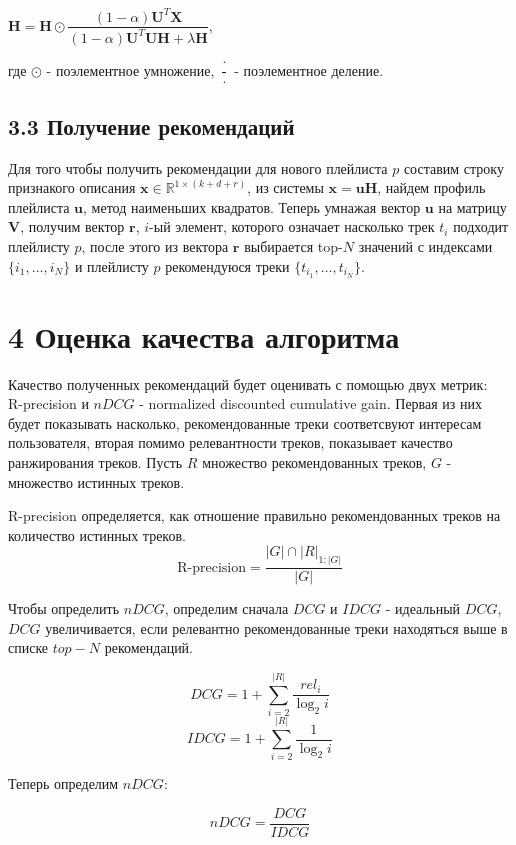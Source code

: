 \documentclass[12pt,twoside]{article}
\begin{document}
$\mathbf{H} = \mathbf{H} \odot \dfrac{(1 - \alpha)\mathbf{U}^T\mathbf{X}}{(1 - \alpha)\mathbf{U}^T\mathbf{UH} + \lambda\mathbf{H}}$,

где $\odot$ - поэлементное умножение, $\dfrac{\cdot}{\cdot}$ - поэлементное деление. 

\subsection{3.3 Получение рекомендаций}

Для того чтобы получить рекомендации для нового плейлиста $p$ составим строку признакого описания $\mathbf{x} \in \mathbb{R}^{1 \times  (k + d + r)}$, из системы $\mathbf{x} = \mathbf{u}\mathbf{H}$, найдем профиль плейлиста $\mathbf{u}$, метод наименьших квадратов. Теперь умнажая вектор $\mathbf{u}$ на матрицу $\mathbf{V}$, получим вектор $\mathbf{r}$, $i$-ый элемент, которого означает насколько трек $t_i$ подходит плейлисту  $p$, после этого из вектора $\mathbf{r}$ выбирается top-$N$ значений с индексами $\{i_1, \ldots, i_N\}$ и плейлисту $p$ рекомендуюся треки $\{t_{i_1}, \ldots, t_{i_N}\}$.

\section{4 Оценка качества алгоритма}

Качество полученных рекомендаций будет оценивать с помощью двух метрик: \\R-precision и $nDCG$ - normalized discounted cumulative gain. Первая из них будет показывать насколько, рекомендованные треки соответсвуют интересам пользователя, вторая помимо релевантности треков, показывает качество ранжирования треков. Пусть $R$ множество рекомендованных треков, $G$ - множество истинных треков.

R-precision определяется, как отношение правильно рекомендованных треков на количество истинных треков.
$$\text{R-precision} = \frac{|G| \cap |R|_{1:|G|}}{|G|}$$

Чтобы определить $nDCG$, определим сначала $DCG$ и $IDCG$ - идеальный $DCG$, $DCG$ увеличивается, если релевантно рекомендованные треки находяться выше в списке $top-N$ рекомендаций.

$$DCG = 1 + \sum_{i = 2}^{|R|} \frac{rel_i}{\log_{2}i}$$
$$IDCG = 1 + \sum_{i = 2}^{|R|} \frac{1}{\log_{2}i}$$

Теперь определим $nDCG$:

$$nDCG = \frac{DCG}{IDCG}$$
\end{document}
